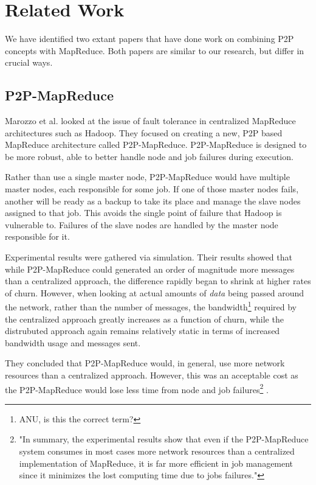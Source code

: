 \documentclass[conference, compsocconf, letterpaper]{IEEEtran}
\begin{document}
\section{Related Work}

We have identified two extant papers that have done work on combining P2P concepts with MapReduce.  Both papers are similar to our research, but differ in crucial ways.

\subsection{P2P-MapReduce}
Marozzo et al. \cite{marozzo2012p2p} looked at the issue of fault tolerance in centralized MapReduce architectures such as Hadoop.  They focused on creating a new, P2P based MapReduce architecture called P2P-MapReduce.  P2P-MapReduce is designed to be more robust, able to better handle node and job failures during execution.

Rather than use a single master node, P2P-MapReduce would have multiple master nodes, each responsible for some job.  If one of those master nodes fails, another will be ready as a backup to take its place and manage the slave nodes assigned to that job.  This avoids the single point of failure that Hadoop is vulnerable to. Failures of the slave nodes are handled by the master node responsible for it.

Experimental results were gathered via simulation. Their results showed that while P2P-MapReduce could generated an order of magnitude more messages than a centralized approach, the difference rapidly began to shrink at higher rates of churn.  However, when looking at actual amounts of \emph{data} being passed around the network, rather than the number of messages, the bandwidth\footnote{ANU, is this the correct term?} required by the centralized approach greatly increases as a function of churn, while the distrubuted approach again remains relatively static in terms of increased bandwidth usage and messages sent.  

They concluded that P2P-MapReduce would, in general, use more network resources than a centralized approach. However, this was an acceptable cost as the P2P-MapReduce would lose less time from node and job failures\footnote{"In summary, the experimental results show that even if the P2P-MapReduce system consumes in most cases more network resources than a centralized implementation of MapReduce, it is far more efficient in job management since it minimizes the lost computing time due to jobs failures."\cite{marozzo2012p2p}} \cite{marozzo2012p2p}.
\end{document}

